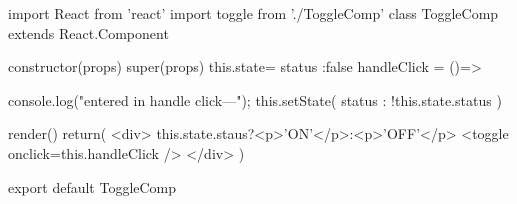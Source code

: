 import React from 'react'
import toggle from './ToggleComp'
class ToggleComp extends React.Component{
          constructor(props){
                    super(props)
                    this.state={
                              status :false
                    }
          }
           handleClick = ()=>{
                    console.log("entered in handle click---");
                    this.setState({
                             status : !this.state.status
                    })
                    
          }
          render(){
                    return(
                              <div>
                                        {this.state.staus?<p>{'ON'}</p>:<p>{'OFF'}</p>}
                                        <toggle onclick={this.handleClick} />
                              </div>
                    )
          }
}
export default ToggleComp